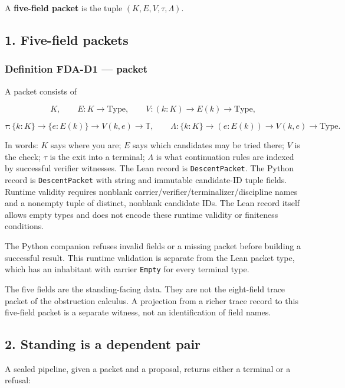 \documentclass[
  11pt,
]{article}
\begin{document}
A \textbf{five-field packet} is the tuple \((K,E,V,\tau,\Lambda)\).

\subsection{1. Five-field packets}\label{five-field-packets}

\subsubsection{Definition FDA-D1 --- packet}\label{definition-fda-d1-packet}

A packet consists of

\[
K,\qquad
E\colon K\to\mathrm{Type},\qquad
V\colon (k:K)\to E(k)\to\mathrm{Type},
\]

\[
\tau\colon \{k:K\}\to\{e:E(k)\}\to V(k,e)\to\mathbb{T},\qquad
\Lambda\colon \{k:K\}\to (e:E(k))\to V(k,e)\to\mathrm{Type}.
\]

In words: \(K\) says where you are; \(E\) says which candidates may be tried there; \(V\) is the check; \(\tau\) is the exit into a terminal; \(\Lambda\) is what continuation rules are indexed by successful verifier witnesses. The Lean record is \texttt{DescentPacket}. The Python record is \texttt{DescentPacket} with string and immutable candidate-ID tuple fields. Runtime validity requires nonblank carrier/verifier/terminalizer/discipline names and a nonempty tuple of distinct, nonblank candidate IDs. The Lean record itself allows empty types and does not encode these runtime validity or finiteness conditions.

The Python companion refuses invalid fields or a missing packet before building a successful result. This runtime validation is separate from the Lean packet type, which has an inhabitant with carrier \texttt{Empty} for every terminal type.

The five fields are the standing-facing data. They are not the eight-field trace packet of the obstruction calculus. A projection from a richer trace record to this five-field packet is a separate witness, not an identification of field names.

\subsection{2. Standing is a dependent pair}\label{standing-is-a-dependent-pair}

A sealed pipeline, given a packet and a proposal, returns either a terminal or a refusal:
\end{document}
